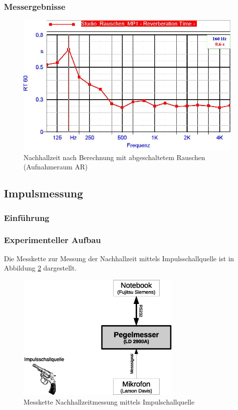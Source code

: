 \documentclass[11pt]{report}
\begin{document}
\subsubsection{Messergebnisse}
\begin{figure}[htbp]
\begin{center}
\includegraphics[width=14cm,keepaspectratio=true]{RauschenMP1}
\caption{Nachhallzeit nach Berechnung mit abgeschaltetem Rauschen (Aufnahmeraum AR)}
\label{fig:i2geometrics}
\end{center}
\end{figure}
\subsection{Impulsmessung}
\subsubsection{Einf\"uhrung}
\label{Impulseinfuehrung}
\subsubsection{Experimenteller Aufbau}
Die Messkette zur Messung der Nachhallzeit mittels Impulsschallquelle ist in Abbildung \ref{fig:impulsaufbau} dargestellt.
\begin{figure}[htbp]
\begin{center}
\includegraphics[width=8cm,keepaspectratio=true]{impulsaufbau}
\caption{Messkette Nachhallzeitmessung mittels Impulschallquelle}
\label{fig:impulsaufbau}
\end{center}
\end{figure}
\end{document}
